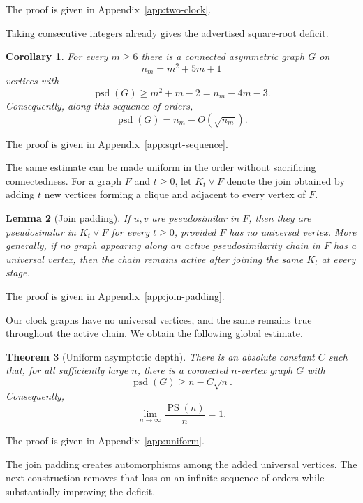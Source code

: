 \documentclass[11pt]{article}
\newtheorem{theorem}{Theorem}[section]
\newtheorem{lemma}[theorem]{Lemma}
\newtheorem{corollary}[theorem]{Corollary}
\theoremstyle{definition}
\theoremstyle{remark}
\newcommand{\psd}{\operatorname{psd}}
\newcommand{\PS}{\operatorname{PS}}
\begin{document}
\par\noindent The proof is given in Appendix~\ref{app:two-clock}.


Taking consecutive integers already gives the advertised square-root deficit.

\begin{corollary}\label{cor:sqrt-sequence}
For every $m\ge6$ there is a connected asymmetric graph $G$ on
\[
    n_m=m^2+5m+1
\]
vertices with
\[
    \psd(G)\ge m^2+m-2=n_m-4m-3.
\]
Consequently, along this sequence of orders,
\[
    \psd(G)=n_m-O(\sqrt{n_m}).
\]
\end{corollary}


\par\noindent The proof is given in Appendix~\ref{app:sqrt-sequence}.


The same estimate can be made uniform in the order without sacrificing connectedness. For a graph $F$ and $t\ge0$, let $K_t\vee F$ denote the join obtained by adding $t$ new vertices forming a clique and adjacent to every vertex of $F$.

\begin{lemma}[Join padding]\label{lem:join-padding}
If $u,v$ are pseudosimilar in $F$, then they are pseudosimilar in $K_t\vee F$ for every $t\ge0$, provided $F$ has no universal vertex. More generally, if no graph appearing along an active pseudosimilarity chain in $F$ has a universal vertex, then the chain remains active after joining the same $K_t$ at every stage.
\end{lemma}


\par\noindent The proof is given in Appendix~\ref{app:join-padding}.


Our clock graphs have no universal vertices, and the same remains true throughout the active chain. We obtain the following global estimate.

\begin{theorem}[Uniform asymptotic depth]\label{thm:uniform}
There is an absolute constant $C$ such that, for all sufficiently large $n$, there is a connected $n$-vertex graph $G$ with
\[
    \psd(G)\ge n-C\sqrt n.
\]
Consequently,
\[
    \lim_{n\to\infty}\frac{\PS(n)}{n}=1.
\]
\end{theorem}


\par\noindent The proof is given in Appendix~\ref{app:uniform}.


The join padding creates automorphisms among the added universal vertices. The next construction removes that loss on an infinite sequence of orders while substantially improving the deficit.
\end{document}
